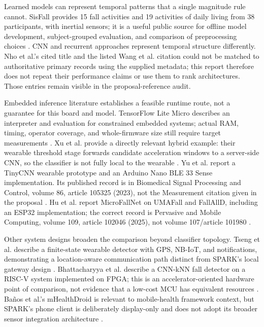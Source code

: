 Learned models can represent temporal patterns that a single magnitude rule cannot. SisFall provides 15 fall activities and 19 activities of daily living from 38 participants, with inertial sensors; it is a useful public source for offline model development, subject-grouped evaluation, and comparison of preprocessing choices \cite{sucerquia2017sisfall}. CNN and recurrent approaches represent temporal structure differently. Nho et al.'s cited title and the listed Wang et al. citation could not be matched to authoritative primary records using the supplied metadata; this report therefore does not repeat their performance claims or use them to rank architectures. Those entries remain visible in the proposal-reference audit.

Embedded inference literature establishes a feasible runtime route, not a guarantee for this board and model. TensorFlow Lite Micro describes an interpreter and evaluation for constrained embedded systems; actual RAM, timing, operator coverage, and whole-firmware size still require target measurements \cite{david2021tensorflow}. Xu et al. provide a directly relevant hybrid example: their wearable threshold stage forwards candidate acceleration windows to a server-side CNN, so the classifier is not fully local to the wearable \cite{xu2021fusion}. Yu et al. report a TinyCNN wearable prototype and an Arduino Nano BLE 33 Sense implementation. Its published record is in Biomedical Signal Processing and Control, volume 86, article 105325 (2023), not the Measurement citation given in the proposal \cite{yu2023tinycnn}. Hu et al. report MicroFallNet on UMAFall and FallAllD, including an ESP32 implementation; the correct record is Pervasive and Mobile Computing, volume 109, article 102046 (2025), not volume 107/article 101980 \cite{hu2025microfallnet}.

Other system designs broaden the comparison beyond classifier topology. Tseng et al. describe a finite-state wearable detector with GPS, NB-IoT, and notifications, demonstrating a location-aware communication path distinct from SPARK's local gateway design \cite{sensors2025wearable}. Bhattacharyya et al. describe a CNN-kNN fall detector on a RISC-V system implemented on FPGA; this is an accelerator-oriented hardware point of comparison, not evidence that a low-cost MCU has equivalent resources \cite{vigil2024fpga}. Ba\~nos et al.'s mHealthDroid is relevant to mobile-health framework context, but SPARK's phone client is deliberately display-only and does not adopt its broader sensor integration architecture \cite{banos2014mhealthdroid}.

